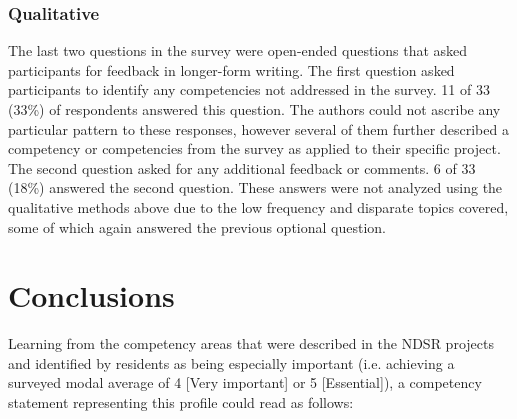 \documentclass{acm_proc_article-sp}
\begin{document}
\subsubsection{Qualitative}
The last two questions in the survey were open-ended questions that asked participants for feedback in longer-form writing. The first question asked participants to identify any competencies not addressed in the survey. 11 of 33 (33\%) of respondents answered this question. The authors could not ascribe any particular pattern to these responses, however several of them further described a competency or competencies from the survey as applied to their specific project. The second question asked for any additional feedback or comments. 6 of 33 (18\%) answered the second question. These answers were not analyzed using the qualitative methods above due to the low frequency and disparate topics covered, some of which again answered the previous optional question. 

\section{Conclusions}
Learning from the competency areas that were described in the NDSR projects and identified by residents as being especially important (i.e. achieving a surveyed modal average of 4 [Very important] or 5 [Essential]), a competency statement representing this profile could read as follows:
\end{document}
